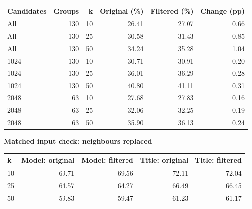 \par\noindent\begin{minipage}{\linewidth}
\small
\setlength{\tabcolsep}{3pt}
\renewcommand{\arraystretch}{1.15}
\label{tab:S19}
\begin{tabular*}{\linewidth}{@{\extracolsep{\fill}}lrrrrr@{}}
\toprule
\textbf{Candidates} & \textbf{Groups} & \textbf{k} & \textbf{Original (\%)} & \textbf{Filtered (\%)} & \textbf{Change (pp)} \\
\midrule
All & 130 & 10 & 26.41 & 27.07 & 0.66 \\[2pt]
All & 130 & 25 & 30.58 & 31.43 & 0.85 \\[2pt]
All & 130 & 50 & 34.24 & 35.28 & 1.04 \\[2pt]
1024 & 130 & 10 & 30.71 & 30.91 & 0.20 \\[2pt]
1024 & 130 & 25 & 36.01 & 36.29 & 0.28 \\[2pt]
1024 & 130 & 50 & 40.80 & 41.11 & 0.31 \\[2pt]
2048 & 63 & 10 & 27.68 & 27.83 & 0.16 \\[2pt]
2048 & 63 & 25 & 32.06 & 32.25 & 0.19 \\[2pt]
2048 & 63 & 50 & 35.90 & 36.13 & 0.24 \\[2pt]
\bottomrule
\end{tabular*}

\par\medskip\textbf{Matched input check: neighbours replaced}\par\smallskip
\begin{tabular*}{\linewidth}{@{\extracolsep{\fill}}lrrrr@{}}
\toprule
\textbf{k} & \textbf{Model: original} & \textbf{Model: filtered} & \textbf{Title: original} & \textbf{Title: filtered} \\
\midrule
10 & 69.71 & 69.56 & 72.11 & 72.04 \\[2pt]
25 & 64.57 & 64.27 & 66.49 & 66.45 \\[2pt]
50 & 59.83 & 59.47 & 61.23 & 61.17 \\[2pt]
\bottomrule
\end{tabular*}
\par{}
\end{minipage}\par
